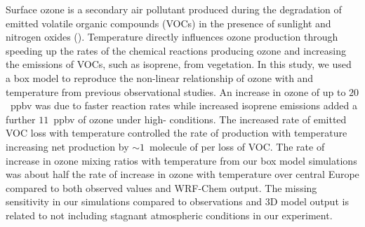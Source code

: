 Surface ozone is a secondary air pollutant produced during the degradation of emitted volatile organic compounds (VOCs) in the presence of sunlight and nitrogen oxides (). 
Temperature directly influences ozone production through speeding up the rates of the chemical reactions producing ozone and increasing the emissions of VOCs, such as isoprene, from vegetation.
In this study, we used a box model to reproduce the non-linear relationship of ozone with  and temperature from previous observational studies.
An increase in ozone of up to $20$~ppbv was due to faster reaction rates while increased isoprene emissions added a further $11$~ppbv of ozone under high- conditions.
The increased rate of emitted VOC loss with temperature controlled the rate of  production with temperature increasing net  production by $\sim1$~molecule of  per loss of VOC.
The rate of increase in ozone mixing ratios with temperature from our box model simulations was about half the rate of increase in ozone with temperature over central Europe compared to both observed values and WRF-Chem output.
The missing sensitivity in our simulations compared to observations and 3D model output is related to not including stagnant atmospheric conditions in our experiment.
